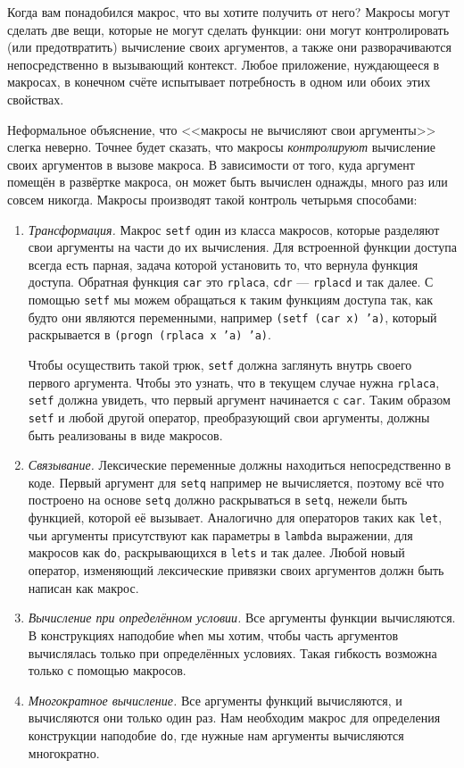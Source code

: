 \documentclass[12pt, a4paper]{article} %
\begin{document}
Когда вам понадобился макрос, что вы хотите получить от него? Макросы могут сделать две вещи, которые не могут сделать функции: они могут контролировать (или предотвратить) вычисление своих аргументов, а также они разворачиваются непосредственно в вызывающий контекст. Любое приложение, нуждающееся в макросах, в конечном счёте испытывает потребность в одном или обоих этих свойствах.

Неформальное объяснение, что <<макросы не вычисляют свои аргументы>> слегка неверно. Точнее будет сказать, что макросы \textit{контролируют} вычисление своих аргументов в вызове макроса. В зависимости от того, куда аргумент помещён в развёртке макроса, он может быть вычислен однажды, много раз или совсем никогда. Макросы производят такой контроль четырьмя способами:
\begin{enumerate}
    \item \textit{Трансформация.} Макрос \texttt{setf} один из класса макросов, которые разделяют свои аргументы на части до их вычисления. Для встроенной функции доступа всегда есть парная, задача которой  установить то, что вернула функция доступа. Обратная функция \texttt{car} это \texttt{rplaca}, \texttt{cdr} --- \texttt{rplacd} и так далее. С помощью \texttt{setf} мы можем обращаться к таким функциям доступа так, как будто они являются переменными, например \texttt{(setf (car x) 'a)}, который раскрывается в \texttt{(progn (rplaca x 'a) 'a)}.

    Чтобы осуществить такой трюк, \texttt{setf} должна заглянуть внутрь своего первого аргумента. Чтобы это узнать, что в текущем случае нужна \texttt{rplaca}, \texttt{setf} должна увидеть, что первый аргумент начинается с \texttt{car}. Таким образом \texttt{setf} и любой другой оператор, преобразующий свои аргументы, должны быть реализованы в виде макросов.

    \item \textit{Связывание.} Лексические переменные должны находиться непосредственно в коде. Первый аргумент для \texttt{setq} например не вычисляется, поэтому всё что построено на основе \texttt{setq} должно раскрываться в \texttt{setq}, нежели быть функцией, которой её вызывает. Аналогично для операторов таких как \texttt{let}, чьи аргументы присутствуют как параметры в \texttt{lambda} выражении, для макросов как \texttt{do}, раскрывающихся в \texttt{lets} и так далее. Любой новый оператор, изменяющий лексические привязки своих аргументов должн быть написан как макрос.
    \item \textit{Вычисление при определённом условии.} Все аргументы функции вычисляются. В конструкциях наподобие \texttt{when} мы хотим, чтобы часть аргументов вычислялась только при определённых условиях. Такая гибкость возможна только с помощью макросов.
    \item \textit{Многократное вычисление.} Все аргументы функций вычисляются, и вычисляются они только один раз. Нам необходим макрос для определения конструкции наподобие \texttt{do}, где нужные нам аргументы вычисляются многократно.
\end{enumerate}
\end{document}
